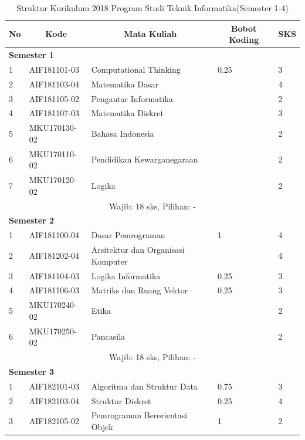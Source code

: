 \begin{table}[H]
	\centering
		\caption{Struktur Kurikulum 2018 Program Studi Teknik Informatika(Semester 1-4)}
		\begin{tabular}{|p{0.5cm}|p{2.85cm}|p{4.95cm}|p{2.7cm}|p{2.7cm}|}
			\hline
			\multicolumn{1}{|c|}{\textbf{No}} & \multicolumn{1}{c|}{\textbf{Kode}} & \multicolumn{1}{c|}{\textbf{Mata Kuliah}} & \multicolumn{1}{c|}{\textbf{Bobot Koding}} & \multicolumn{1}{c|}{\textbf{SKS}} \\ \hline
			\multicolumn{5}{|l|}{\textbf{Semester 1}} \\ \hline
			1 &	AIF181101-03 &	Computational Thinking &	0.25 &	3   \\ \hline
			2 &	AIF181103-04 &	Matematika Dasar &	&	4  \\ \hline
			3 &	AIF181105-02 &	Pengantar Informatika &  & 2  \\ \hline
			4	& AIF181107-03 &	Matematika Diskret &	&	3  \\ \hline
			5	& MKU170130-02 &	Bahasa Indonesia &	&	2  \\ \hline
			6	& MKU170110-02 &	Pendidikan Kewarganegaraan &	&	2  \\ \hline
			7	& MKU170120-02 &	Logika &	&	2  \\ \hline
			\multicolumn{5}{|c|}{Wajib: 18 sks, Pilihan: -} \\ \hline
			\multicolumn{5}{|l|}{\textbf{Semester 2}} \\ \hline
			1 &	AIF181100-04 &	Dasar Pemrograman &	1 &	4 \\ \hline
			2 &	AIF181202-04 &	Arsitektur dan Organisasi Komputer & &	4  \\ \hline
			3 &	AIF181104-03 &	Logika Informatika &	0.25 &	3  \\ \hline
			4 &	AIF181106-03 &	Matriks dan Ruang Vektor &	0.25 &	3  \\ \hline
			5 &	MKU170240-02 &	Etika	& &	2  \\ \hline
			6 &	MKU170250-02 &	Pancasila & &	2  \\ \hline
			\multicolumn{5}{|c|}{Wajib: 18 sks, Pilihan: - }\\ \hline
			\multicolumn{5}{|l|}{\textbf{Semester 3}} \\ \hline
			1 &	AIF182101-03 &	Algoritma dan Struktur Data &	0.75 &	3  \\ \hline
			2 &	AIF182103-04 &	Struktur Diskret &	0.25 &	4  \\ \hline
			3 &	AIF182105-02 &	Pemrograman Berorientasi Objek &	1 &	2   \\ \hline

\end{tabular}
\end{table}
